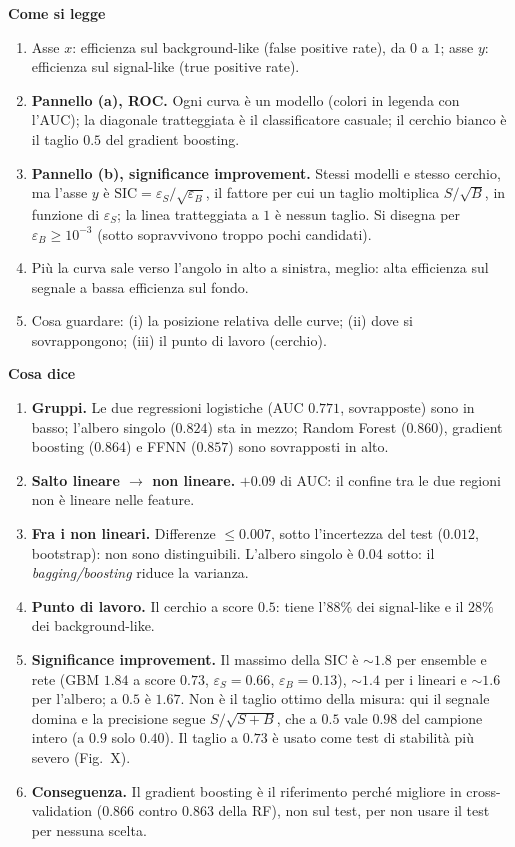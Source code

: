 \documentclass[10.5pt,a4paper]{article}
\newcommand{\sez}[1]{\par\Needspace{6\baselineskip}\medskip\noindent\textbf{\large #1}\par\nopagebreak\smallskip}
\begin{document}
\sez{Come si legge}
\begin{enumerate}
\item Asse $x$: efficienza sul background-like (false positive rate), da $0$ a $1$; asse $y$: efficienza sul signal-like (true positive rate).
\item \textbf{Pannello (a), ROC.} Ogni curva è un modello (colori in legenda con l'AUC); la diagonale tratteggiata è il classificatore casuale; il cerchio bianco è il taglio $0.5$ del gradient boosting.
\item \textbf{Pannello (b), significance improvement.} Stessi modelli e stesso cerchio, ma l'asse $y$ è $\mathrm{SIC}=\varepsilon_S/\sqrt{\varepsilon_B}$, il fattore per cui un taglio moltiplica $S/\sqrt B$, in funzione di $\varepsilon_S$; la linea tratteggiata a $1$ è nessun taglio. Si disegna per $\varepsilon_B\ge10^{-3}$ (sotto sopravvivono troppo pochi candidati).
\item Più la curva sale verso l'angolo in alto a sinistra, meglio: alta efficienza sul segnale a bassa efficienza sul fondo.
\item Cosa guardare: (i) la posizione relativa delle curve; (ii) dove si sovrappongono; (iii) il punto di lavoro (cerchio).
\end{enumerate}

\sez{Cosa dice}
\begin{enumerate}
\item \textbf{Gruppi.} Le due regressioni logistiche (AUC $0.771$, sovrapposte) sono in basso; l'albero singolo ($0.824$) sta in mezzo; Random Forest ($0.860$), gradient boosting ($0.864$) e FFNN ($0.857$) sono sovrapposti in alto.
\item \textbf{Salto lineare $\to$ non lineare.} $+0.09$ di AUC: il confine tra le due regioni non è lineare nelle feature.
\item \textbf{Fra i non lineari.} Differenze $\le0.007$, sotto l'incertezza del test ($0.012$, bootstrap): non sono distinguibili. L'albero singolo è $0.04$ sotto: il \emph{bagging/boosting} riduce la varianza.
\item \textbf{Punto di lavoro.} Il cerchio a score $0.5$: tiene l'$88\%$ dei signal-like e il $28\%$ dei background-like.
\item \textbf{Significance improvement.} Il massimo della SIC è $\sim1.8$ per ensemble e rete (GBM $1.84$ a score $0.73$, $\varepsilon_S=0.66$, $\varepsilon_B=0.13$), $\sim1.4$ per i lineari e $\sim1.6$ per l'albero; a $0.5$ è $1.67$. Non è il taglio ottimo della misura: qui il segnale domina e la precisione segue $S/\sqrt{S+B}$, che a $0.5$ vale $0.98$ del campione intero (a $0.9$ solo $0.40$). Il taglio a $0.73$ è usato come test di stabilità più severo (Fig.~X).
\item \textbf{Conseguenza.} Il gradient boosting è il riferimento perché migliore in cross-validation ($0.866$ contro $0.863$ della RF), non sul test, per non usare il test per nessuna scelta.
\end{enumerate}
\end{document}

